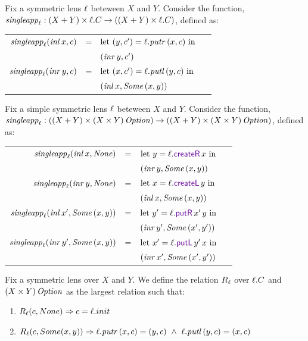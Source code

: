 \documentclass[acmsmall,screen,anonymous]{acmart}
\begin{document}
\begin{definition}
  Fix a symmetric lens $\mathit{\ell}$ beteween $X$ and $Y$. Consider the
  function, $\mathit{singleapp}_{\mathit{\ell}} : (X + Y) \times \mathit{\ell}.C
  \rightarrow ((X + Y) \times \mathit{\ell}.C)$, defined as:

  \begin{tabular}{@{}r@{\ }c@{\ }l@{\ }l}
    $\mathit{singleapp}_{\mathit{\ell}}(\mathit{inl} \, x,c)$
    & =
    & $\text{let } (y,c') = \mathit{\ell}.\mathit{putr} \, (x,c)\text{ in }$\\
    &
    & $(\mathit{inr} \, y,c')$\\
    
    $\mathit{singleapp}_{\mathit{\ell}}(\mathit{inr} \, y,c)$
    & =
    & $\text{let } (x,c') = \mathit{\ell}.\mathit{putl} \, (y,c)\text{ in }$\\
    &
    & $(\mathit{inl} \, x,\mathit{Some}\,(x,y))$
  \end{tabular}
\end{definition}

\begin{definition}
  Fix a simple symmetric lens $\mathit{\ell}$ beteween $X$ and $Y$. Consider the
  function, $\mathit{singleapp}_{\mathit{\ell}} : ((X + Y) \times (X \times Y) \, \mathit{Option})
  \rightarrow ((X + Y) \times (X \times Y) \, \mathit{Option})$, defined as:

  \begin{tabular}{@{}r@{\ }c@{\ }l@{\ }l}
    $\mathit{singleapp}_{\mathit{\ell}}(\mathit{inl} \, x,\mathit{None})$
    & =
    & $\LetIn{y}{\Lens.\CreateROf{x}}$\\
    &
    & $(\mathit{inr} \, y,\mathit{Some}\,(x,y))$\\
    
    $\mathit{singleapp}_{\mathit{\ell}}(\mathit{inr} \, y,\mathit{None})$
    & =
    & $\LetIn{x}{\Lens.\CreateLOf{y}}$\\
    &
    & $(\mathit{inl} \, x,\mathit{Some}\,(x,y))$\\
    
    $\mathit{singleapp}_{\mathit{\ell}}(\mathit{inl} \, x',\mathit{Some}\,(x,y))$
    & =
    & $\LetIn{y'}{\Lens.\PutROf{x'}{y}}$\\
    &
    & $(\mathit{inr} \, y',\mathit{Some}\,(x',y'))$\\
    
    $\mathit{singleapp}_{\mathit{\ell}}(\mathit{inr} \, y',\mathit{Some}\,(x,y))$
    & =
    & $\LetIn{x'}{\Lens.\PutLOf{y'}{x}}$\\
    &
    & $(\mathit{inr} \, x',\mathit{Some}\,(x',y'))$\\
  \end{tabular}
\end{definition}

\begin{definition}
  Fix a symmetric lens \Lens over $X$ and $Y$. We define the relation $R_\mathit{\ell}$
  over $\mathit{\ell}.C$ and $(X \times Y) \, \mathit{Option}$ as the largest relation such
  that:
  \begin{enumerate}
  \item $R_\mathit{\ell}(c,None) \Rightarrow c = \mathit{\ell}.init$
  \item $R_\mathit{\ell}(c,Some (x,y)) \Rightarrow
    \mathit{\ell}.\mathit{putr} \, (x,c) = (y,c) ~\wedge~
    \mathit{\ell}.\mathit{putl} \, (y,c) = (x,c)$
  \end{enumerate}
\end{definition}
\end{document}
